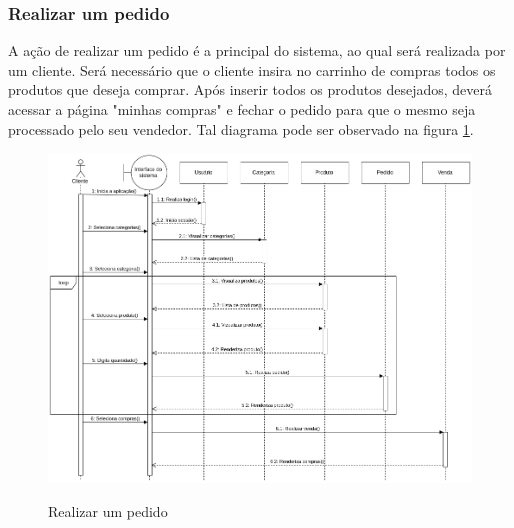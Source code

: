 \subsubsection{Realizar um pedido}
A ação de realizar um pedido é a principal do sistema, ao qual será realizada por um cliente. Será necessário que o cliente insira no carrinho de compras todos os produtos que deseja comprar. Após inserir todos os produtos desejados, deverá acessar a página "minhas compras" e fechar o pedido para que o mesmo seja processado pelo seu vendedor. Tal diagrama pode ser observado na figura \ref{fig:sequence3}.
\begin{figure}[htbp!]
  \centering
  \caption{Realizar um pedido}
  \includegraphics[width=1\textwidth]{figs/sequence3.png}
    \label{fig:sequence3}
\end{figure}

